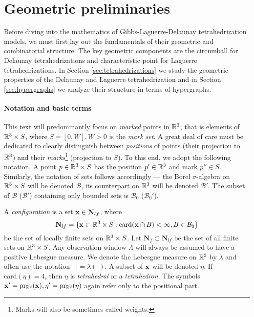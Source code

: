 \chapter{Geometric preliminaries}\label{ch:1}
Before diving into the mathematics of Gibbs-Laguerre-Delaunay tetrahedrization models, we must first lay out the fundamentals of their geometric and combinatorial structure. The key geometric components are the circumball for Delaunay tetrahedrizations and characteristic point for Laguerre tetrahedrizations. 
In Section \ref{sec:tetrahedrizations} we study the geometric properties of the Delaunay and Laguerre tetrahedrization and in Section \ref{sec:hypergraphs} we analyze their structure in terms of hypergraphs.

\subsubsection{Notation and basic terms}
This text will predominantly focus on \textit{marked} points in ${\mathbb R^3}$, that is elements of ${\mathbb R^3} \times S$, where $S=[0,W],W>0$ is the \textit{mark set}. A great deal of care must be dedicated to clearly distinguish between \textit{positions} of points (their projection to ${\mathbb R^3}$) and their \textit{marks}\footnote{Marks will also be sometimes called weights.} (projection to $S$). To this end, we adopt the following notation. A point $p \in {\mathbb R^3}\times S$ has the position $p'\in {\mathbb R^3}$ and mark $p'' \in S$. Similarly, the notation of sets follows accordingly --- the Borel $\sigma$-algebra on ${\mathbb R^3}\times S$ will be denoted $\mathcal B$, its counterpart on ${\mathbb R^3}$ will be denoted $\mathcal B'$. The subset of $\mathcal B$ ($\mathcal B'$) containing only bounded sets is $\mathcal B_0$ ($\mathcal B_0'$). 

A \textit{configuration} is a set ${\mathbf{x}} \in \mathbf N_{lf}$, where 
$$\mathbf N_{lf} = \{{\mathbf{x}} \subset {\mathbb R^3}\times S: \mathrm{card}({\mathbf{x}} \cap B) < \infty, B\in \mathcal B_0\} $$ 
be the set of locally finite sets on ${\mathbb R^3}\times S$. Let $\mathbf N_{f} \subset \mathbf N_{lf}$ be the set of all finite sets on ${\mathbb R^3}\times S$. 
 Any observation window $\Lambda$ will always be assumed to have a positive Lebesgue measure. We denote the Lebesgue measure on ${\mathbb R^3}$ by $\lambda$ and often use the notation $|\cdot|=\lambda(\cdot)$.
A subset of ${\mathbf{x}}$ will be denoted $\eta$. If $\mathrm{card}(\eta)=4$, then $\eta$ is \textit{tetrahedral} or a \textit{tetrahedron}. The symbols ${\mathbf{x}}'=\mathrm{pr_{{\mathbb R^3}}}({\mathbf{x}}), \eta'=\mathrm{pr_{{\mathbb R^3}}}(\eta)$ again refer only to the positional part. 

